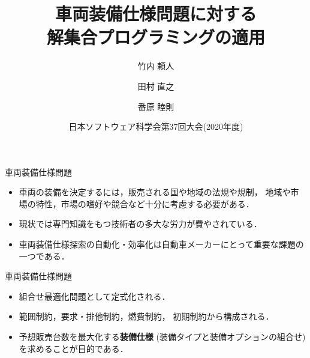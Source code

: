 \documentclass[dvipdfmx, 11pt]{beamer}
\title{車両装備仕様問題に対する\\解集合プログラミングの適用}
\author{竹内 頼人\inst{1} \and 田村 直之\inst{2} \and 番原 睦則\inst{1}}
\institute{\inst{1}名古屋大学 \and \inst{2}神戸大学}
\date{日本ソフトウェア科学会第37回大会(2020年度)}
\begin{document}
\begin{frame} {}
 \titlepage
\end{frame}
\begin{frame}{車両装備仕様問題}
 \begin{itemize}
  \item 車両の装備を決定するには，販売される国や地域の法規や規制，
    地域や市場の特性，市場の嗜好や競合など十分に考慮する必要がある．
  \item 現状では専門知識をもつ技術者の多大な労力が費やされている．
  \item 車両装備仕様探索の自動化・効率化は自動車メーカーにとって重要な課題の一つである．
 \end{itemize}
 \vfill
 \begin{alertblock}{車両装備仕様問題}
  \begin{itemize}
   \item 組合せ最適化問題として定式化される．
   \item \alert{範囲制約}，\alert{要求・排他制約}，\alert{燃費制約}，
	 \alert{初期制約}から構成される．
   \item \alert{予想販売台数を最大化}する{\bf 装備仕様}
	 (装備タイプと装備オプションの組合せ)を求めることが目的である．
  \end{itemize}
 \end{alertblock}
\end{frame}
\end{document}
